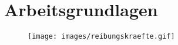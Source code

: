 \section{Arbeitsgrundlagen}

\begin{figure}
    \centering
    \texttt{[image: images/reibungskraefte.gif]}
    \caption{}
\end{figure}

